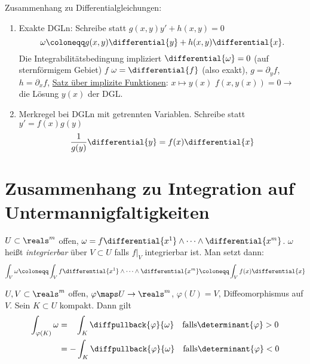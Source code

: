 \begin{bemerkung}
  Zusammenhang zu Differentialgleichungen: 
  \begin{enumerate}
      \item Exakte DGLn: Schreibe statt \( g(x,y)y'+h(x,y)=0 \)
      \begin{equation*}
          \omega\coloneqq g(x,y)\differential{y}+h(x,y)\differential{x}.
      \end{equation*}
      Die Integrabilitätsbedingung impliziert \( \differential{\omega}=0 \) \timplies (auf sternförmigem Gebiet) \texists  \(  f \) \sd \( \omega=\differential{f} \) (also exakt), \( g=\partial_y f\), \( h=\partial_x f \),
      \hyperref[satz_von_der_impliziten_funktion]{Satz über implizite Funktionen}: \texists  \(  x \mapsto y(x)\) \sd \( f(x,y(x))=0\to  \) die Lösung \( y(x) \) der DGL.\@
      \item Merkregel bei DGLn mit getrennten Variablen. Schreibe statt \( y'=f(x)g(y) \)
      \begin{equation*}
          \frac{1}{g(y)} \differential{y}=f(x)\differential{x}
      \end{equation*}
  \end{enumerate}
\end{bemerkung}

\section{Zusammenhang zu Integration auf Untermannigfaltigkeiten}

\begin{definition}
  \( U\subset\reals^m \) offen, \( \omega=f\differential{x^1}\wedge\dotsb \wedge\differential{x^m} \).
  \( \omega \) heißt \emph{integrierbar} über \( V\subset U\) falls \( f|_V \) integrierbar ist.
  Man setzt dann:
  \begin{equation*}
      \int_V\omega\coloneqq \int_V f\differential{x^1}\wedge\dotsb \wedge\differential{x^m}\coloneqq \int_V f(x)\differential{x}
  \end{equation*}
\end{definition}

\begin{lemma}\label{uebertragung_integral}
  \( U,V\subset\reals^m \) offen, \( \varphi\maps U\to\reals^m\), \( \varphi(U)=V \), Diffeomorphismus auf \( V \).
  Sein \( K\subset U \) kompakt.
  Dann gilt 
  \begin{align*}
      \int_{\varphi(K)}\omega &=\hspace*{0.87em} \int_{K}\diffpullback{\varphi}{\omega}\quad \mathrm{falls }\determinant{\varphi}>0\\
      &= -\int_{K} \diffpullback{\varphi}{\omega} \quad \mathrm{falls }\determinant{\varphi}<0
  \end{align*}
\end{lemma}

